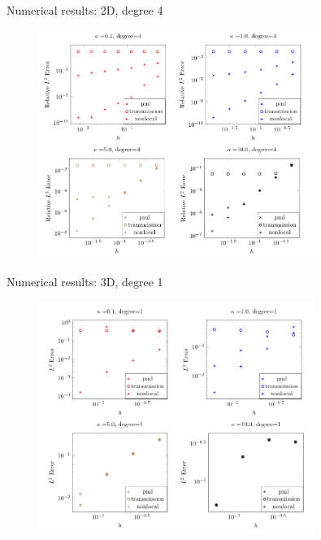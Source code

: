 \documentclass{beamer}
\begin{document}
\begin{frame}{Numerical results: 2D, degree 4}
    \begin{figure}[ht]
    \begin{center}
        \includegraphics[width=0.8\textwidth]{images/degree-4-accuracy.png}
    \end{center}
    \end{figure}
\end{frame}
\begin{frame}{Numerical results: 3D, degree 1}
    \begin{figure}[ht]
    \begin{center}
        \includegraphics[width=0.8\textwidth]{images/3d-accuracy.png}
    \end{center}
    \end{figure}
\end{frame}
\end{document}
